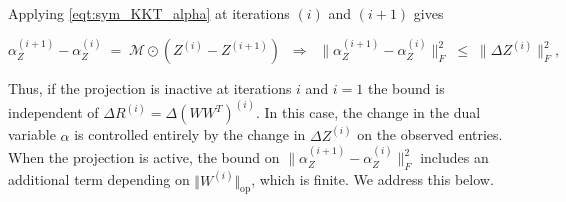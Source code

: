 \documentclass{article}
\begin{document}
Applying \eqref{eqt:sym_KKT_alpha} at iterations $(i)$ and $(i+1)$ gives

\begin{equation}
\alpha_Z^{(i+1)} - \alpha_Z^{(i)}
\;=\; \mathcal{M} \odot (Z^{(i)} - Z^{(i+1)})
\;\;\Longrightarrow\;\;
\|\alpha_Z^{(i+1)} - \alpha_Z^{(i)}\|_F^2 \;\leq\; \|\Delta Z^{(i)}\|_F^2,
\label{eqt:sym_alpha_tight}
\end{equation}

Thus, if the projection is inactive at iterations $i$ and $i=1$ the bound is independent of $\Delta R^{(i)} = \Delta(W W^T)^{(i)}$. In this case, the change in the dual variable $\alpha$ is controlled entirely by the change in $\Delta Z^{(i)}$ on the observed entries. When the projection is active, the bound on $\|\alpha_Z^{(i+1)} - \alpha_Z^{(i)}\|_F^2$ includes an additional term depending on $\Vert W^{(i)}\Vert_{\text{op}}$, which is finite. We address this below.
\end{document}
